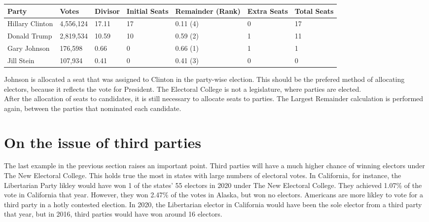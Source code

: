 \documentclass{article}
\begin{document}
    \begin{adjustbox}{center}
    \begin{tabular}{ |l|l|l|l|l|l|l| }
        \hline
        Party & Votes & Divisor & Initial Seats & Remainder (Rank) & Extra Seats & Total Seats \\
        \hline
        Hillary Clinton & 4,556,124 & 17.11 & 17 & 0.11 (4) & 0 & 17 \\
        \hline
        Donald Trump & 2,819,534 & 10.59 & 10 & 0.59 (2) & 1 & 11 \\
        \hline
        Gary Johnson & 176,598 & 0.66 & 0 & 0.66 (1) & 1 & 1 \\
        \hline
        Jill Stein & 107,934 & 0.41 & 0 & 0.41 (3) & 0 & 0 \\
        \hline
    \end{tabular}
    \end{adjustbox}

    Johnson is allocated a seat that was assigned to Clinton in the party-wise election. This should be the prefered method of allocating electors, because it reflects the vote for President. The Electoral College is not a legislature, where parties are elected.\\
    
    After the allocation of seats to candidates, it is still necessary to allocate seats to parties. The Largest Remainder calculation is performed again, between the parties that nominated each candidate.\\

    \section{On the issue of third parties}%

    The last example in the previous section raises an important point. Third parties will have a much higher chance of winning electors under The New Electoral College. This holds true the most in states with large numbers of electoral votes. In California, for instance, the Libertarian Party likley would have won 1 of the states' 55 electors in 2020 under The New Electoral College. They achieved 1.07\% of the vote in California that year. However, they won 2.47\% of the votes in Alaska, but won no electors. Americans are more likley to vote for a third party in a hotly contested election. In 2020, the Libertarian elector in California would have been the sole elector from a third party that year, but in 2016, third parties would have won around 16 electors.\\
\end{document}
